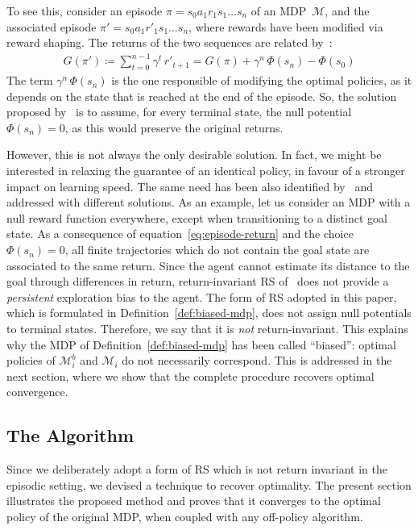 \documentclass[letterpaper]{article} %
\theoremstyle{plain}
\theoremstyle{definition}
\theoremstyle{remark}
\newcommand{\SetSym}[1]{\mathcal{#1}}
\newcommand{\Trace}{\pi}
\newcommand{\Model}{\SetSym{M}}
\newcommand{\Potential}{\Phi}
\newcommand{\Biased}[1]{#1^{b}}
\newcommand{\ReturnSym}{G}
\begin{document}
To see this, consider an episode $\Trace = s_0 a_1 r_1 s_1 \dots s_n$ of an
MDP~$\Model$, and the associated episode $\Trace' = s_0 a_1 r'_1 s_1 \dots s_n$, where
rewards have been modified via reward shaping. The returns of the two sequences
are related by~\cite{grzes2017reward}:
\begin{align}
\ReturnSym(\Trace') \coloneqq \sum_{t=0}^{n-1} \gamma^t\, r'_{t+1} = \ReturnSym(\Trace) + \gamma^n\, \Potential(s_n) - \Potential(s_0)
\label{eq:episode-return}
\end{align}
The term $\gamma^n\, \Potential(s_n)$ is the one responsible of modifying the optimal policies, as it depends on the state that is reached at the end of the episode.
So, the solution proposed by~\cite{grzes2017reward} is to assume, for every terminal state, the null potential
${\Potential(s_n) = 0}$, as this would preserve the original returns.

However, this is not always the only desirable solution.
In fact, we might be interested in relaxing the guarantee of an identical policy, in favour of a stronger impact on learning speed.
The same need has been also identified by~\cite{schubert_2021_PlanbasedRelaxed} and addressed with different solutions.
As an example, let us consider an MDP with a null reward function everywhere, except when transitioning to a distinct goal state.
As a consequence of equation~\eqref{eq:episode-return} and the choice $\Potential(s_n) = 0$, all finite trajectories which do not contain the goal state are associated to the same return.
Since the agent cannot estimate its distance to the goal through differences in return, return-invariant RS of~\cite{grzes2017reward} does not provide a \emph{persistent} exploration bias to the agent.
The form of RS adopted in this paper, which is formulated in Definition~\ref{def:biased-mdp}, does not assign null potentials to terminal states.
Therefore, we say that it is \emph{not} return-invariant.
This explains why the MDP of Definition~\ref{def:biased-mdp} has been called \mbox{``biased''}:
optimal policies of $\Biased{\Model}_i$ and $\Model_i$ do not necessarily correspond.
This is addressed in the next section, where we show that the complete procedure recovers optimal convergence.


\subsection{The Algorithm}
\label{sec:algorithm}

Since we deliberately adopt a form of RS which is not return invariant in the episodic setting, we devised a technique to recover optimality.
The present section illustrates the proposed method and proves that it converges to the optimal policy of the original MDP, when coupled with any off-policy algorithm.
\end{document}
